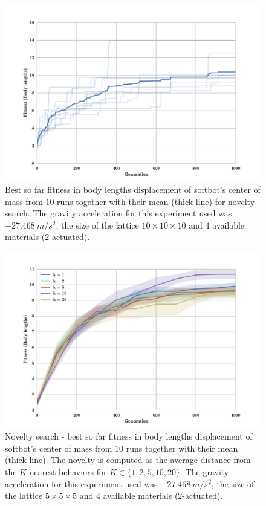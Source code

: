 \begin{figure}[h!]
\centering
\includegraphics[width=1.0\textwidth]{../Figures/Results/indRunnAvgSize10Novelty.pdf}
\caption{Best so far fitness in body lengths displacement of softbot's center of mass from $10$ runs together with their mean (thick line) for novelty search. The gravity acceleration for this experiment used was $-27.468\   m/s^2$, the size of the lattice $10\times 10\times10$ and $4$ available materials ($2$-actuated).}
\label{fig:indRunnAvgSize10Novelty}
\end{figure}


\begin{figure}
\centering
\includegraphics[width=1.0\textwidth]{../Figures/Results/KnnExperimentSize5.pdf}
\caption{Novelty search - best so far fitness in body lengths displacement of softbot's center of mass from $10$ runs together with their mean (thick line). The novelty is computed as the average distance from the $K$-nearest behaviors for $K \in \lbrace 1,2,5,10,20 \rbrace $. The gravity acceleration for this experiment used was $-27.468\   m/s^2$, the size of the lattice $5\times 5\times5$ and $4$ available materials ($2$-actuated).}
\label{fig:KnnExperimentSize5}
\end{figure}


